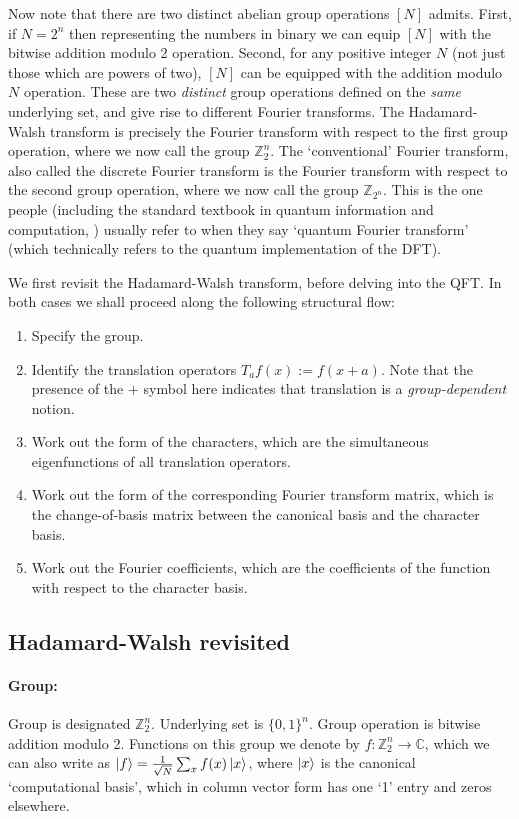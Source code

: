 Now note that there are two distinct abelian group operations $[N]$ admits. First, if $N=2^n$ then representing the numbers in binary we can equip $[N]$ with the bitwise addition modulo 2 operation. Second, for any positive integer $N$ (not just those which are powers of two), $[N]$ can be equipped with the addition modulo $N$ operation. These are two \textit{distinct} group operations defined on the \textit{same} underlying set, and give rise to different Fourier transforms. The Hadamard-Walsh transform is precisely the Fourier transform with respect to the first group operation, where we now call the group $\mathbb{Z}_2^n$. The `conventional' Fourier transform, also called the discrete Fourier transform is the Fourier transform with respect to the second group operation, where we now call the group $\mathbb{Z}_{2^n}$. This is the one people (including the standard textbook in quantum information and computation, \cite{NC10}) usually refer to when they say `quantum Fourier transform' (which technically refers to the quantum implementation of the DFT). 

We first revisit the Hadamard-Walsh transform, before delving into the QFT. In both cases we shall proceed along the following structural flow:
\begin{enumerate}
    \item Specify the group.
    \item Identify the translation operators $T_af(x) := f(x+a)$. Note that the presence of the $+$ symbol here indicates that translation is a \textit{group-dependent} notion.
    \item Work out the form of the characters, which are the simultaneous eigenfunctions of all translation operators.
    \item Work out the form of the corresponding Fourier transform matrix, which is the change-of-basis matrix between the canonical basis and the character basis.
    \item Work out the Fourier coefficients, which are the coefficients of the function with respect to the character basis.
\end{enumerate}

\subsection{Hadamard-Walsh revisited}

\paragraph{Group:} Group is designated $\mathbb{Z}_2^n.$ Underlying set is $\{0,1\}^n$. Group operation is bitwise addition modulo 2. Functions on this group we denote by $f: \mathbb{Z}_2^n \to \mathbb{C}$, which we can also write as $\ket{f} = \frac{1}{\sqrt{N}} \sum_x f(x)\ket{x}$, where $\ket{x}$ is the canonical `computational basis', which in column vector form has one `1' entry and zeros elsewhere. 

